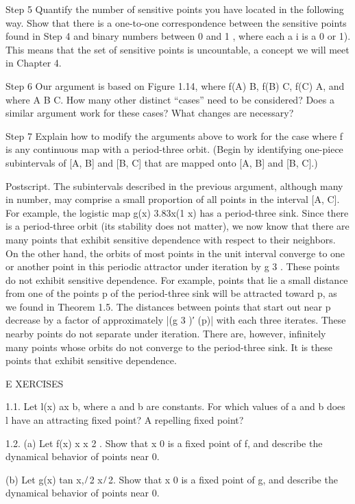 Step 5 Quantify the number of sensitive points you have located in the following way. Show that there is a 
one-to-one correspondence between the sensitive points found in Step 4 and binary numbers between 0 and 1 
, where each a i is a 0 or 1). This means that the set of sensitive points is uncountable, a concept we 
will meet in Chapter 4.

Step 6 Our argument is based on Figure 1.14, where f(A)  B, f(B)  C, f(C)  A, and where A  B  C. How many 
other distinct “cases” need to be considered? Does a similar argument work for these cases? What changes 
are necessary?

Step 7 Explain how to modify the arguments above to work for the case where f is any continuous map with a 
period-three orbit. (Begin by identifying one-piece subintervals of [A, B] and [B, C] that are mapped onto 
[A, B] and [B, C].)

Postscript. The subintervals described in the previous argument, although many in number, may comprise a 
small proportion of all points in the interval [A, C]. For example, the logistic map g(x)  3.83x(1  x) has 
a period-three sink. Since there is a period-three orbit (its stability does not matter), we now know that 
there are many points that exhibit sensitive dependence with respect to their neighbors. On the other hand, 
the orbits of most points in the unit interval converge to one or another point in this periodic attractor 
under iteration by g 3 . These points do not exhibit sensitive dependence. For example, points that lie a 
small distance from one of the points p of the period-three sink will be attracted toward p, as we found in 
Theorem 1.5. The distances between points that start out near p decrease by a factor of approximately |(g 3 
)′ (p)| with each three iterates. These nearby points do not separate under iteration. There are, however, 
inﬁnitely many points whose orbits do not converge to the period-three sink. It is these points that 
exhibit sensitive dependence.

E XERCISES

1.1. Let l(x)  ax b, where a and b are constants. For which values of a and b does l have an attracting 
ﬁxed point? A repelling ﬁxed point?

1.2. (a) Let f(x)  x  x 2 . Show that x  0 is a ﬁxed point of f, and describe the dynamical behavior of 
points near 0.

(b) Let g(x)  tan x,  
 ̸ 2  x  
 ̸ 2. Show that x  0 is a ﬁxed point of g, and describe the dynamical behavior of points near 0.

